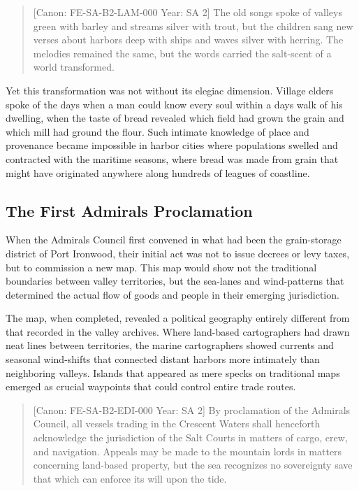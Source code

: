 \begin{quote}
{[}Canon: FE-SA-B2-LAM-000 \textbar{} Year: SA 2{]} The old songs spoke
of valleys green with barley and streams silver with trout, but the
children sang new verses about harbors deep with ships and waves silver
with herring. The melodies remained the same, but the words carried the
salt-scent of a world transformed.
\end{quote}

Yet this transformation was not without its elegiac dimension. Village
elders spoke of the days when a man could know every soul within a
day\textquotesingle s walk of his dwelling, when the taste of bread
revealed which field had grown the grain and which mill had ground the
flour. Such intimate knowledge of place and provenance became impossible
in harbor cities where populations swelled and contracted with the
maritime seasons, where bread was made from grain that might have
originated anywhere along hundreds of leagues of coastline.

\subsection{The First Admiral\textquotesingle s
Proclamation}\label{the-first-admirals-proclamation}

When the Admiral\textquotesingle s Council first convened in what had
been the grain-storage district of Port Ironwood, their initial act was
not to issue decrees or levy taxes, but to commission a new map. This
map would show not the traditional boundaries between valley
territories, but the sea-lanes and wind-patterns that determined the
actual flow of goods and people in their emerging jurisdiction.

The map, when completed, revealed a political geography entirely
different from that recorded in the valley archives. Where land-based
cartographers had drawn neat lines between territories, the marine
cartographers showed currents and seasonal wind-shifts that connected
distant harbors more intimately than neighboring valleys. Islands that
appeared as mere specks on traditional maps emerged as crucial waypoints
that could control entire trade routes.

\begin{quote}
{[}Canon: FE-SA-B2-EDI-000 \textbar{} Year: SA 2{]} By proclamation of
the Admiral\textquotesingle s Council, all vessels trading in the
Crescent Waters shall henceforth acknowledge the jurisdiction of the
Salt Courts in matters of cargo, crew, and navigation. Appeals may be
made to the mountain lords in matters concerning land-based property,
but the sea recognizes no sovereignty save that which can enforce its
will upon the tide.
\end{quote}

